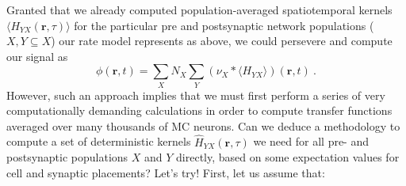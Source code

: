 Granted that we already computed  population-averaged spatiotemporal kernels $\langle H_{YX} (\mathbf{r}, \tau) \rangle$ for the particular pre and postsynaptic network populations ($X, Y \subseteq X$) our rate model represents as above,
we could persevere and compute our signal as
\begin{equation}
\phi(\mathbf{r}, t) = \sum_X N_X \sum_Y \left( \nu_X \ast \langle H_{YX} \rangle \right)(\mathbf{r}, t) ~.
\end{equation}
However, such an approach implies that we must first perform a series of very computationally demanding calculations
in order to compute transfer functions averaged over many thousands of MC neurons.
Can we deduce a methodology to compute a set of deterministic kernels $\hat{H}_{YX}(\mathbf{r}, \tau)$ we need for all pre- and postsynaptic populations $X$ and $Y$ directly,
based on some expectation values for cell and synaptic placements?
Let's try!
First, let us assume that:
